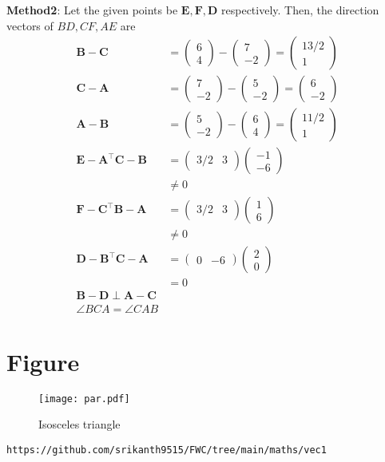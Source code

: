 \documentclass{article}
\newcommand{\myvec}[1]{\ensuremath{\begin{pmatrix}#1\end{pmatrix}}}
\let\vec\mathbf
\begin{document}
\textbf{Method2}: Let the given points be $\vec{E}, \vec{F}, \vec{D}$ respectively. 
 Then, the direction vectors of  $BD ,CF,AE$ are
\begin{align}
\vec{B}-\vec{C}&= \myvec{6 \\ 4}-\myvec{7 \\-2} = \myvec{13/2 \\ 1}\\
\vec{C}-\vec{A}&= \myvec{7 \\-2}-\myvec{5 \\-2} = \myvec{6 \\ -2}\\
\vec{A}-\vec{B}&= \myvec{5 \\ -2} -\myvec{6 \\4} = \myvec{11/2 \\ 1}\\
{\vec{E}-\vec{A}}^{\top}{\vec{C}-\vec{B}}&= \myvec{3/2 & 3}\myvec{-1 \\ -6}\\
&\neq0\\
{\vec{F}-\vec{C}}^{\top}{\vec{B}-\vec{A}}&= \myvec{3/2 & 3}\myvec{1 \\ 6}\\
&\neq 0\\
{\vec{D}-\vec{B}}^{\top}{\vec{C}-\vec{A}}&= \myvec{0 & -6}\myvec{2 \\ 0}\\
&=0 \\
{\vec{B} -\vec{D}}\perp {\vec{A} -\vec{C}}\\
\angle BCA = \angle CAB  
\end{align}

\pagebreak\section{Figure}
\begin{figure}[h]
\texttt{[image: par.pdf]}
\caption{Isosceles triangle}
		\label{fig:Figure}
\end{figure}
\begin{lstlisting}
https://github.com/srikanth9515/FWC/tree/main/maths/vec1
\end{lstlisting}
\end{document}
